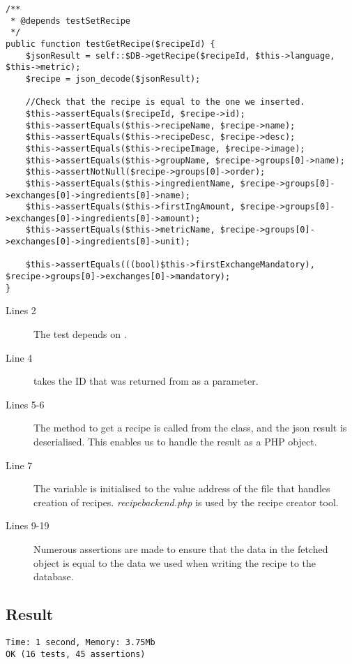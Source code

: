 \begin{lstlisting}[language=phpstyle]
/**
 * @depends testSetRecipe
 */
public function testGetRecipe($recipeId) {
    $jsonResult = self::$DB->getRecipe($recipeId, $this->language, $this->metric);
    $recipe = json_decode($jsonResult);

    //Check that the recipe is equal to the one we inserted.
    $this->assertEquals($recipeId, $recipe->id);
    $this->assertEquals($this->recipeName, $recipe->name);
    $this->assertEquals($this->recipeDesc, $recipe->desc);
    $this->assertEquals($this->recipeImage, $recipe->image);
    $this->assertEquals($this->groupName, $recipe->groups[0]->name);
    $this->assertNotNull($recipe->groups[0]->order);
    $this->assertEquals($this->ingredientName, $recipe->groups[0]->exchanges[0]->ingredients[0]->name);
    $this->assertEquals($this->firstIngAmount, $recipe->groups[0]->exchanges[0]->ingredients[0]->amount);
    $this->assertEquals($this->metricName, $recipe->groups[0]->exchanges[0]->ingredients[0]->unit);

    $this->assertEquals(((bool)$this->firstExchangeMandatory), $recipe->groups[0]->exchanges[0]->mandatory);
}
\end{lstlisting}%
\begin{description}
\item[Lines 2] The test depends on .
\item[Line 4]  takes the ID that was returned from  as a parameter.
\item[Lines 5-6] The method to get a recipe is called from the  class, and the \ac{json} result is deserialised. This enables us to handle the result as a PHP object.
\item[Line 7] The  variable is initialised to the value address of the file that handles creation of recipes. \textit{recipebackend.php} is used by the recipe creator tool.%
\item[Lines 9-19] Numerous assertions are made to ensure that the data in the fetched object is equal to the data we used when writing the recipe to the database.
\end{description}

\subsection*{Result}
\begin{lstlisting}[numbers=none, basicstyle=\ttfamily, caption={The result of the PHPUnit test.}]
Time: 1 second, Memory: 3.75Mb
OK (16 tests, 45 assertions)
\end{lstlisting}

